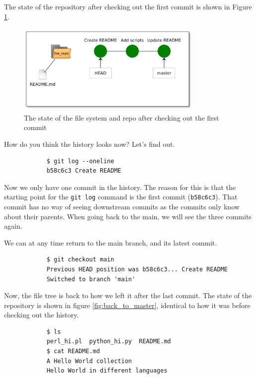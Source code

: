 \documentclass[../main/git_course_main.tex]{subfiles}
\begin{document}
	The state of the repository after checking out the first commit is shown in Figure \ref{fig:checkout}.
	
	\begin{figure}[h]
		\centering
		\includegraphics[width=0.8\textwidth]{../visualizations/chapter3/c31_repo_checkout_commit.pdf}
		\caption{The state of the file system and repo after checking out the first commit}
		\label{fig:checkout}
	\end{figure}
	
	How do you think the history looks now? Let's find out.
	
	\begin{codebox}
		\begin{lstlisting}
			$ git log --oneline
			b58c6c3 Create README
		\end{lstlisting}
	\end{codebox}
	
	Now we only have one commit in the history. The reason for this is that the starting point
	for the \verb$git log$ command is the first commit (\verb$b58c6c3$). That commit has no way
	of seeing downstream commits as the commits only know about their parents. When going back to the main, we will see the three commits again.
	
	We can at any time return to the main branch, and its latest commit.
	
	\begin{codebox}
		\begin{lstlisting}
			$ git checkout main
			Previous HEAD position was b58c6c3... Create README
			Switched to branch 'main'
		\end{lstlisting}
	\end{codebox}
	
	Now, the file tree is back to how we left it after the last commit. The state of the repository is shown in figure \ref{fig:back_to_master}, identical to how it was before checking out the history.
	
	\begin{codebox}
		\begin{lstlisting}
			$ ls
			perl_hi.pl  python_hi.py  README.md
			$ cat README.md
			A Hello World collection
			Hello World in different languages
		\end{lstlisting}
	\end{codebox}
	
\end{document}
